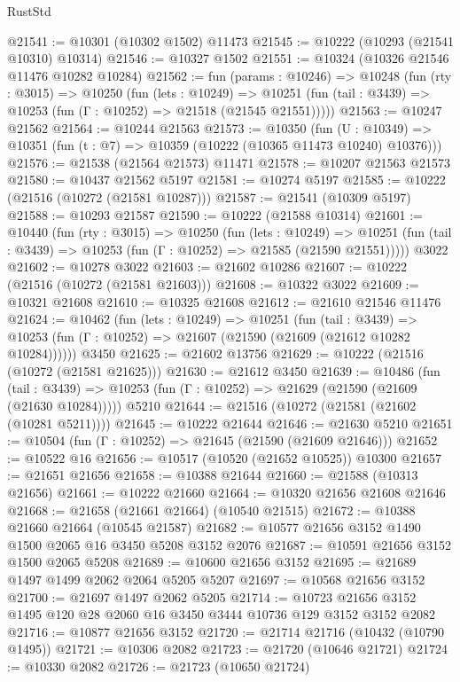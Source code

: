 \begin{lexlean}{RustStd}
\begin{coremodule}
@21541 := @10301 (@10302 @1502) @11473
@21545 := @10222 (@10293 (@21541 @10310) @10314)
@21546 := @10327 @1502
@21551 := @10324 (@10326 @21546 @11476 @10282 @10284)
@21562 := fun (params : @10246) =>
  @10248
    (fun (rty : @3015) =>
    @10250
      (fun (lets : @10249) =>
      @10251 (fun (tail : @3439) => @10253 (fun (Γ : @10252) => @21518 (@21545 @21551)))))
@21563 := @10247 @21562
@21564 := @10244 @21563
@21573 := @10350
    (fun (U : @10349) => @10351 (fun (t : @7) => @10359 (@10222 (@10365 @11473 @10240) @10376)))
@21576 := @21538 (@21564 @21573) @11471
@21578 := @10207 @21563 @21573
@21580 := @10437 @21562 @5197
@21581 := @10274 @5197
@21585 := @10222 (@21516 (@10272 (@21581 @10287)))
@21587 := @21541 (@10309 @5197)
@21588 := @10293 @21587
@21590 := @10222 (@21588 @10314)
@21601 := @10440
    (fun (rty : @3015) =>
    @10250
      (fun (lets : @10249) =>
      @10251 (fun (tail : @3439) => @10253 (fun (Γ : @10252) => @21585 (@21590 @21551)))))
    @3022
@21602 := @10278 @3022
@21603 := @21602 @10286
@21607 := @10222 (@21516 (@10272 (@21581 @21603)))
@21608 := @10322 @3022
@21609 := @10321 @21608
@21610 := @10325 @21608
@21612 := @21610 @21546 @11476
@21624 := @10462
    (fun (lets : @10249) =>
    @10251
      (fun (tail : @3439) =>
      @10253 (fun (Γ : @10252) => @21607 (@21590 (@21609 (@21612 @10282 @10284))))))
    @3450
@21625 := @21602 @13756
@21629 := @10222 (@21516 (@10272 (@21581 @21625)))
@21630 := @21612 @3450
@21639 := @10486
    (fun (tail : @3439) => @10253 (fun (Γ : @10252) => @21629 (@21590 (@21609 (@21630 @10284)))))
    @5210
@21644 := @21516 (@10272 (@21581 (@21602 (@10281 @5211))))
@21645 := @10222 @21644
@21646 := @21630 @5210
@21651 := @10504 (fun (Γ : @10252) => @21645 (@21590 (@21609 @21646)))
@21652 := @10522 @16
@21656 := @10517 (@10520 (@21652 @10525)) @10300
@21657 := @21651 @21656
@21658 := @10388 @21644
@21660 := @21588 (@10313 @21656)
@21661 := @10222 @21660
@21664 := @10320 @21656 @21608 @21646
@21668 := @21658 (@21661 @21664) (@10540 @21515)
@21672 := @10388 @21660 @21664 (@10545 @21587)
@21682 := @10577 @21656 @3152 @1490 @1500 @2065 @16 @3450 @5208 @3152 @2076
@21687 := @10591 @21656 @3152 @1500 @2065 @5208
@21689 := @10600 @21656 @3152
@21695 := @21689 @1497 @1499 @2062 @2064 @5205 @5207
@21697 := @10568 @21656 @3152
@21700 := @21697 @1497 @2062 @5205
@21714 := @10723 @21656 @3152 @1495 @120 @28 @2060 @16 @3450 @3444 @10736 @129 @3152 @3152 @2082
@21716 := @10877 @21656 @3152
@21720 := @21714 @21716 (@10432 (@10790 @1495))
@21721 := @10306 @2082
@21723 := @21720 (@10646 @21721)
@21724 := @10330 @2082
@21726 := @21723 (@10650 @21724)

\end{coremodule}
\end{lexlean}
